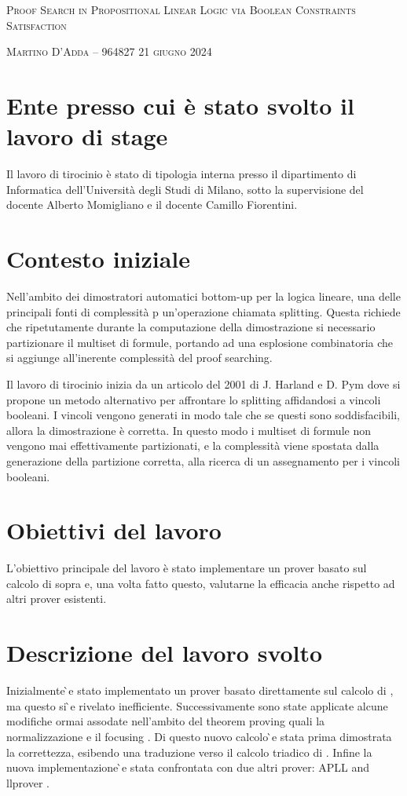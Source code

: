 \documentclass[a4paper, 12pt, italian]{extarticle}
\begin{document}
\begin{center}
{\huge
\begin{setspace}{1.125}
\textsc{Proof Search in Propositional Linear Logic via Boolean Constraints Satisfaction}
\end{setspace}
}
\vspace{.2cm}
\textsc{Martino D'Adda -- 964827}
\vspace{.2cm}
\textsc{21 giugno 2024}
\end{center}

\section{Ente presso cui è stato svolto il lavoro di stage}
Il lavoro di tirocinio è stato di tipologia interna presso il dipartimento di Informatica dell'Università degli Studi di Milano, sotto la supervisione del docente Alberto Momigliano e il docente Camillo Fiorentini.

\section{Contesto iniziale}
Nell'ambito dei dimostratori automatici bottom-up per la logica lineare, una delle principali fonti di complessità p un'operazione chiamata splitting.
Questa richiede che ripetutamente durante la computazione della dimostrazione si necessario partizionare il multiset di formule, portando ad una esplosione combinatoria che si aggiunge all'inerente complessità del proof searching.

Il lavoro di tirocinio inizia da un articolo del 2001 di J. Harland e D. Pym \cite{HarlandPym} dove si propone un metodo alternativo per affrontare lo splitting affidandosi a vincoli booleani.
I vincoli vengono generati in modo tale che se questi sono soddisfacibili, allora la dimostrazione è corretta. 
In questo modo i multiset di formule non vengono mai effettivamente partizionati, e la complessità viene spostata dalla generazione della partizione corretta, alla ricerca di un assegnamento per i vincoli booleani.

\section{Obiettivi del lavoro}
L'obiettivo principale del lavoro è stato implementare un prover basato sul calcolo di sopra e, una volta fatto questo, valutarne la efficacia anche rispetto ad altri prover esistenti.

\section{Descrizione del lavoro svolto}
Inizialmente ̀e stato implementato un prover basato direttamente sul calcolo di \cite{HarlandPym}, ma questo si ̀e rivelato inefficiente.
Successivamente sono state applicate alcune modifiche ormai assodate nell’ambito del theorem proving quali la normalizzazione e il focusing \cite{Focusing}.
Di questo nuovo calcolo ̀e stata prima dimostrata la correttezza, esibendo una traduzione verso il calcolo triadico di \cite{Focusing}.
Infine la nuova implementazione ̀e stata confrontata con due altri prover: APLL \cite{APLL} and llprover \cite{llprover}.
\end{document}
